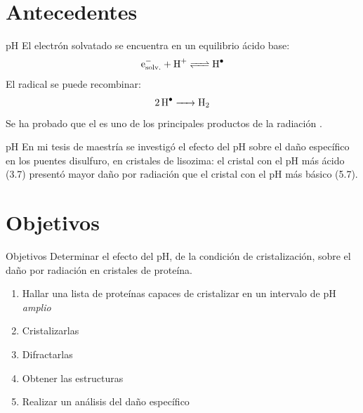 \documentclass{beamer}
\begin{document}
\section{Antecedentes}
\begin{frame}{pH}
El electrón solvatado se encuentra en un equilibrio ácido base:
 \begin{equation*}
  \ce{e^{-}_{solv.} + H^{+} <=> H^{.}}
 \end{equation*}
El radical  se puede recombinar:
 \begin{equation*}
  \ce{2H^{.}      ->        H2}
 \end{equation*} 
Se ha probado que el  es uno de los principales productos de la radiación \cite{Meents2010}. 
\end{frame}
\begin{frame}{pH}
En mi tesis de maestría se investigó el efecto del pH sobre el daño específico en los puentes disulfuro, en cristales de lisozima: el cristal con el pH más ácido (3.7) presentó mayor daño por radiación que el cristal con el pH más básico (5.7).
\end{frame}
\section{Objetivos}
\begin{frame}{Objetivos}
Determinar el efecto del pH, de la condición de cristalización, sobre el daño por radiación en cristales de proteína.
 \begin{enumerate}
  \item Hallar una lista de proteínas capaces de cristalizar en un intervalo de pH \emph{amplio}
  \item Cristalizarlas
  \item Difractarlas
  \item Obtener las estructuras 
  \item Realizar un análisis del daño específico
 \end{enumerate}	
\end{frame}
\end{document}
